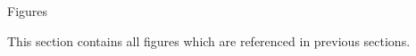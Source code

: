 %
\def\pwidth{.49\textwidth}
\def\pheight{.33\textheight}
\newcommand{\addgraphics}[2]{
  \centering
  \texttt{[image: imgs/\#1]}
}

\begin{section}{Figures}\label{sec:Figures}

  This section contains all figures which are referenced in previous sections.

  

\end{section}

